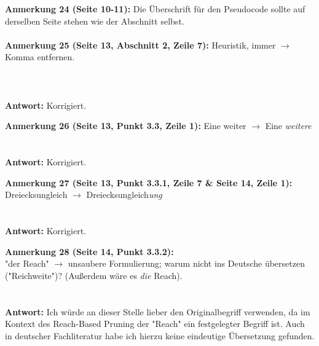 \documentclass[a4paper,12pt]{book}
\begin{document}
\noindent
\textbf{Anmerkung 24 (Seite 10-11):}
Die Überschrift für den Pseudocode sollte auf derselben Seite stehen wie der Abschnitt selbst. \\
\\

\noindent
\textbf{Anmerkung 25 (Seite 13, Abschnitt 2, Zeile 7):}
Heuristik\emph{,} immer $\rightarrow$ Komma entfernen. \\
\\
\\ \\
\textbf{Antwort:}
Korrigiert.

\noindent
\textbf{Anmerkung 26 (Seite 13, Punkt 3.3, Zeile 1):}
Eine weiter $\rightarrow$ Eine \emph{weitere} \\
\\ \\
\textbf{Antwort:}
Korrigiert.

\noindent
\textbf{Anmerkung 27 (Seite 13, Punkt 3.3.1, Zeile 7 \& Seite 14, Zeile 1):}\\
Dreiecksungleich $\rightarrow$ Dreiecksungleich\emph{ung} \\
\\ \\
\textbf{Antwort:}
Korrigiert.

\noindent
\textbf{Anmerkung 28 (Seite 14, Punkt 3.3.2):}\\
"der Reach" $\rightarrow$ unsaubere Formulierung; warum nicht ins Deutsche übersetzen ("Reichweite")? (Außerdem wäre es \emph{die} Reach). \\
\\ \\
\textbf{Antwort:}
Ich würde an dieser Stelle lieber den Originalbegriff verwenden, da im Kontext des Reach-Based Pruning der "Reach" ein festgelegter Begriff ist. Auch in deutscher Fachliteratur habe ich hierzu keine eindeutige Übersetzung gefunden.
\end{document}
